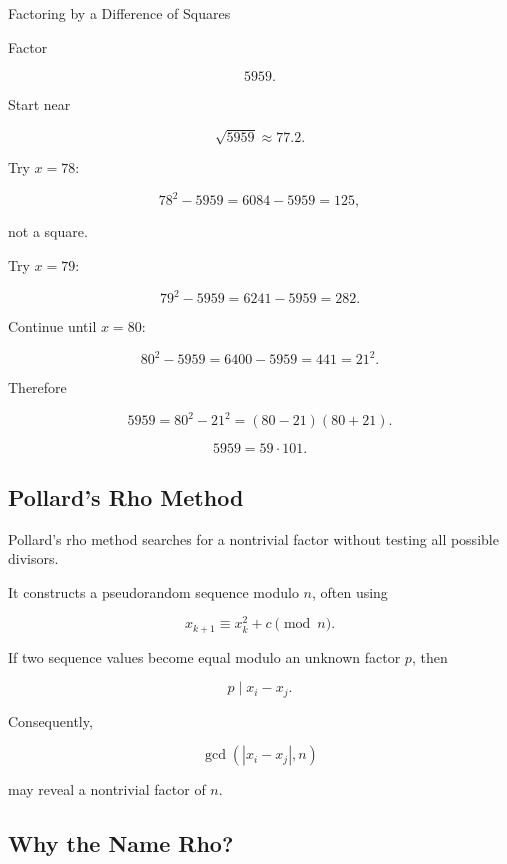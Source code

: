 \begin{workedexamplebox}{Factoring by a Difference of Squares}

Factor

\[ 5959. \]

Start near

\[ \sqrt{5959}\approx77.2. \]

Try \(x=78\):

\[ 78^2-5959=6084-5959=125, \]

not a square.

Try \(x=79\):

\[ 79^2-5959=6241-5959=282. \]

Continue until \(x=80\):

\[ 80^2-5959=6400-5959=441=21^2. \]

Therefore

\[ 5959=80^2-21^2=(80-21)(80+21). \]

\begin{answerbox}
\[ \boxed{5959=59\cdot101.} \]
\end{answerbox}
\end{workedexamplebox}

\subsection{Pollard's Rho Method}
\label{subsec:pollard-rho}

Pollard's rho method searches for a nontrivial factor without testing all
possible divisors.

It constructs a pseudorandom sequence modulo \(n\), often using

\[ x_{k+1}\equiv x_k^2+c\pmod n. \]

If two sequence values become equal modulo an unknown factor \(p\), then

\[ p\mid x_i-x_j. \]

Consequently,

\[ \gcd(|x_i-x_j|,n) \]

may reveal a nontrivial factor of \(n\).

\subsection{Why the Name Rho?}
\label{subsec:why-pollard-rho}

